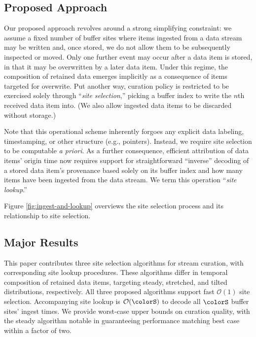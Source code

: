\subsection{Proposed Approach}



Our proposed approach revolves around a strong simplifying constraint: we assume a fixed number of buffer sites where items ingested from a data stream may be written and, once stored, we do not allow them to be subsequently inspected or moved.
Only one further event may occur after a data item is stored, in that it may be overwritten by a later data item.
Under this regime, the composition of retained data emerges implicitly as a consequence of items targeted for overwrite.
Put another way, curation policy is restricted to be exercised solely through ``\textit{site selection},'' picking a buffer index to write the $n$th received data item into.
(We also allow ingested data items to be discarded without storage.)

Note that this operational scheme inherently forgoes any explicit data labeling, timestamping, or other structure (e.g., pointers).
Instead, we require site selection to be computable \textit{a priori}.
As a further consequence, efficient attribution of data items' origin time now requires support for straightforward ``inverse'' decoding of a stored data item's provenance based solely on its buffer index and how many items have been ingested from the data stream.
We term this operation ``\textit{site lookup}.''

Figure \ref{fig:ingest-and-lookup} overviews the site selection process and its relationship to site selection.

\subsection{Major Results}

This paper contributes three site selection algorithms for stream curation, with corresponding site lookup procedures.
These algorithms differ in temporal composition of retained data items, targeting steady, stretched, and tilted distributions, respectively.
All three proposed algorithms support fast $\mathcal{O}(1)$ site selection.
Accompanying site lookup is $\mathcal{O}(\colorS)$ to decode all $\colorS$ buffer sites' ingest times.
We provide worst-case upper bounds on curation quality, with the steady algorithm notable in guaranteeing performance matching best case within a factor of two.
